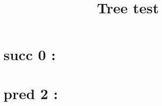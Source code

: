 \documentclass{article}
\title{Tree test}
\begin{document}
\section*{succ 0 :}

\section*{pred 2 :}

\end{document}
